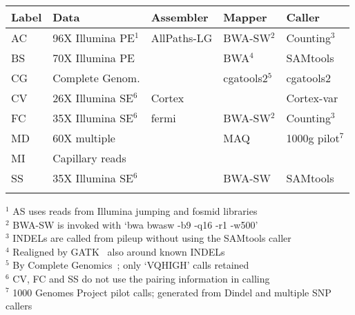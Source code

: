 \documentclass{bioinfo}
\begin{document}
\begin{table}[!htb]
{\begin{tabular}{lllll}
\toprule
Label & Data & Assembler & Mapper & Caller \\
\midrule
AC & 96X Illumina PE$^1$ & AllPaths-LG & BWA-SW$^2$ & Counting$^3$ \\
BS & 70X Illumina PE & & BWA$^4$ & SAMtools \\
CG & Complete Genom.& & cgatools2$^5$ & cgatools2 \\
CV & 26X Illumina SE$^6$ & Cortex & & Cortex-var \\
FC & 35X Illumina SE$^6$ & fermi & BWA-SW$^2$ & Counting$^3$ \\
MD & 60X multiple        & & MAQ & 1000g pilot$^7$ \\
MI & Capillary reads     & \\
SS & 35X Illumina SE$^6$ & & BWA-SW & SAMtools \\
\botrule
\end{tabular}}{
$^1$ AS uses reads from Illumina jumping and fosmid libraries\\
$^2$ BWA-SW is invoked with `bwa bwasw -b9 -q16 -r1 -w500'\\
$^3$ INDELs are called from pileup without using the SAMtools caller\\
$^4$ Realigned by GATK~\citep{Depristo:2011vn} also around known INDELs\\
$^5$ By Complete Genomics~\citep{Drmanac:2010ly}; only `VQHIGH' calls retained\\
$^6$ CV, FC and SS do not use the pairing information in calling\\
$^7$ 1000 Genomes Project pilot calls; generated from Dindel and multiple SNP callers\\
}
\end{table}
\end{document}

